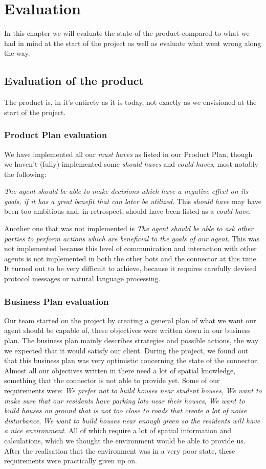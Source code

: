 \chapter{Evaluation}
In this chapter we will evaluate the state of the product compared to what we had in mind at the start of the project as well as evaluate what went wrong along the way.

\section{Evaluation of the product}
The product is, in it's entirety as it is today, not exactly as we envisioned at the start of the project.

\subsection{Product Plan evaluation} We have implemented all our \emph{must haves} as listed in our Product Plan, though we haven't (fully) implemented some \emph{should haves} and \emph{could haves}, most notably the following:

\emph{The agent should be able to make decisions which have a negative effect on its goals, if it has a great benefit that can later be utilized.} This \emph{should have} may have been too ambitious and, in retrospect, should have been listed as a \emph{could have}.

Another one that was not implemented is \emph{The agent should be able to ask other parties to perform actions which are beneficial to the goals of our agent}. This was not implemented because this level of communication and interaction with other agents is not implemented in both the other bots and the connector at this time. It turned out to be very difficult to achieve, because it requires carefully devised protocol messages or natural language processing.

\subsection{Business Plan evaluation} Our team started on the project by creating a general plan of what we want our agent should be capable of, these objectives were written down in our business plan. The business plan mainly describes strategies and possible actions, the way we expected that it would satisfy our client. During the project, we found out that this business plan was very optimistic concerning the state of the connector. Almost all our objectives written in there need a lot of spatial knowledge, something that the connector is not able to provide yet. Some of our requirements were: \emph{We prefer not to build houses near student houses}, \emph{We want to make sure that our residents have parking lots near their houses}, \emph{We want to build houses on ground that is not too close to roads that create a lot of noise disturbance}, \emph{We want to build houses near enough green so the residents will have a nice environment}. All of which require a lot of spatial information and calculations, which we thought the environment would be able to provide us. After the realisation that the environment was in a very poor state, these requirements were practically given up on.

